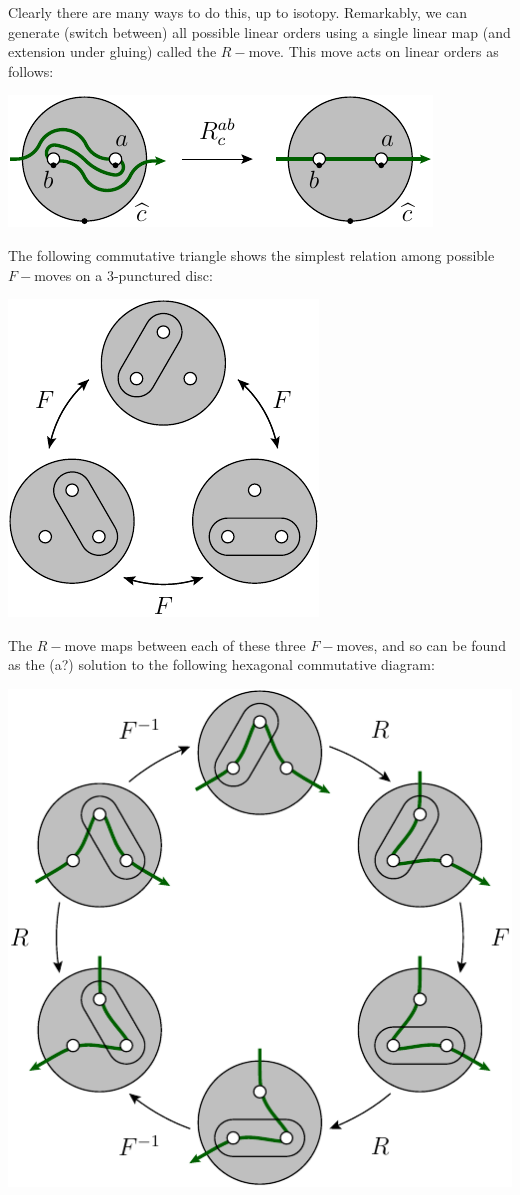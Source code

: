 \documentclass[aps, prl, letterpaper, twocolumn, superscriptaddress, notitlepage, 10pt]{revtex4-1}
\begin{document}
Clearly there are many ways to do this, up to isotopy.
Remarkably, we can generate (switch between)
all possible linear orders using 
a single linear map (and extension under gluing)
called the $R-$move.
This move acts on linear orders as follows:
\begin{center}
\includegraphics[]{pic-rmove-1.pdf}
\end{center}
The following commutative triangle shows the simplest
relation among possible $F-$moves on a 3-punctured
disc:
\begin{center}
\includegraphics[]{pic-fmove-relation.pdf}
\end{center}
The $R-$move maps between each of these
three $F-$moves, and so can be found as the (a?)
solution to the
following hexagonal commutative diagram:
\begin{center}
\includegraphics[]{pic-hexagon.pdf}
\end{center}
\end{document}
